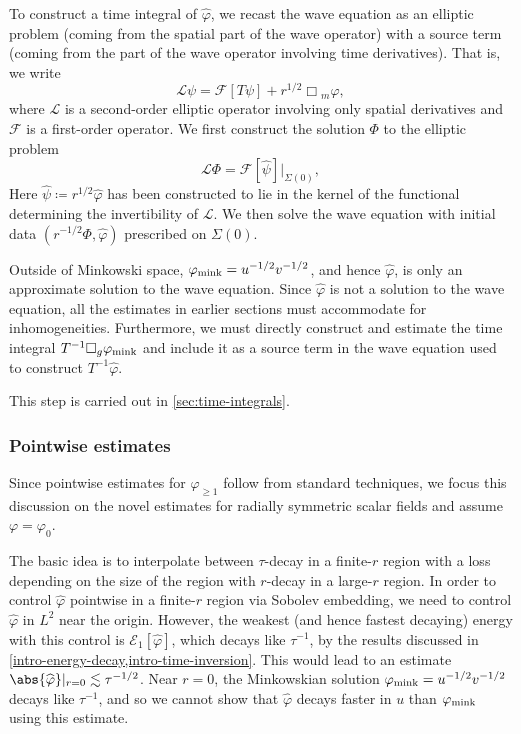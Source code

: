 \documentclass[10pt, reqno]{amsart}
\begin{document}
To construct a time integral of \(\widehat{\varphi{}}\), we recast the wave
equation as an elliptic problem (coming from the spatial part of the wave
operator) with a source term (coming from the part of the wave operator
involving time derivatives). That is, we write
\begin{equation}
\mathcal{L}\psi{} = \mathcal{F}[T\psi{}] + r^{1/2}\Box{}_{m}\varphi{},
\end{equation}
where \(\mathcal{L}\) is a second-order elliptic operator involving only spatial
derivatives and \(\mathcal{F}\) is a first-order operator. We first construct
the solution \(\Phi{}\) to the elliptic problem
\begin{equation}
\mathcal{L}\Phi{} = \mathcal{F}[\widehat{\psi{}}]|_{\Sigma{}(0)},
\end{equation}
Here \(\widehat{\psi{}}\coloneqq{}r^{1/2}\widehat{\varphi{}}\) has been constructed to lie in the
kernel of the functional determining the invertibility of \(\mathcal{L}\). We
then solve the wave equation with initial data
\((r^{-1/2}\Phi{},\widehat{\varphi{}})\) prescribed on \(\Sigma{}(0)\).
\begin{remark}
Outside of Minkowski space, \(\varphi_{\textnormal{mink}} = u^{-1/2}v^{-1/2}\), and hence \(\widehat{\varphi{}}\), is only
an approximate solution to the wave equation. Since \(\widehat{\varphi{}}\) is
not a solution to the wave equation, all the estimates in earlier sections must
accommodate for inhomogeneities. Furthermore, we must directly construct and
estimate the time integral \(T^{-1}\Box{}_g\varphi_{\textnormal{mink}}\) and include
it as a source term in the wave equation used to construct
\(T^{-1}\widehat{\varphi{}}\).
\end{remark}
This step is carried out in \cref{sec:time-integrals}.
\subsubsection{Pointwise estimates}
\label{intro-pointwise} Since pointwise estimates for \(\varphi_{\ge 1}\) follow from
standard techniques, we focus this discussion on the novel estimates for
radially symmetric scalar fields and assume \(\varphi{} = \varphi_0\).

The basic idea is to interpolate between \(\tau{}\)-decay in a finite-\(r\) region
with a loss depending on the size of the region with \(r\)-decay in a
large-\(r\) region. In order to control \(\widehat{\varphi{}}\) pointwise in a
finite-\(r\) region via Sobolev embedding, we need to control
\(\widehat{\varphi{}}\) in \(L^2\) near the origin. However, the weakest (and
hence fastest decaying) energy with this control is
\(\mathcal{E}_1[\widehat{\varphi{}}]\), which decays like \(\tau^{-1}\), by the
results discussed in \cref{intro-energy-decay,intro-time-inversion}. This would
lead to an estimate \(\abs{\widehat{\varphi{}}}|_{r=0}\lesssim \tau^{-1/2}\).
Near \(r=0\), the Minkowskian solution \(\varphi_{\textnormal{mink}} =
u^{-1/2}v^{-1/2}\) decays like \(\tau^{-1}\), and so we cannot show that
\(\widehat{\varphi{}}\) decays faster in \(u\) than \(\varphi_{\textnormal{mink}}\)
using this estimate.
\end{document}
